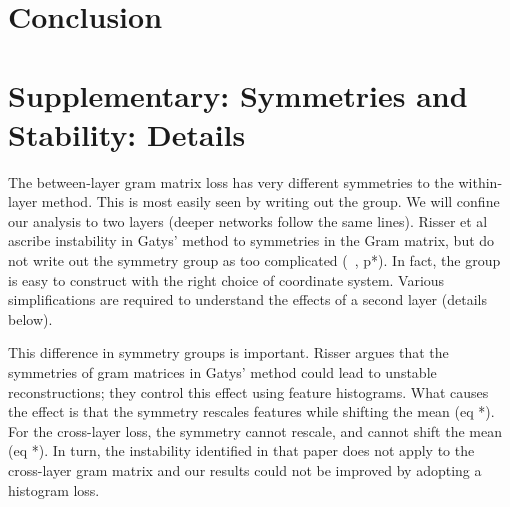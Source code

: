 \documentclass[runningheads]{llncs}
\newcommand{\expect}[1]{{\mathbb{E}}{{\left[{{#1}}\right]}}}
\begin{document}










\section{Conclusion}
  

\section*{Supplementary: Symmetries and Stability: Details}


The between-layer gram matrix loss has very different symmetries to the within-layer method.
This is most easily seen by writing out the group.  We will confine our analysis to two layers
(deeper networks follow the same lines).   Risser et al ascribe instability in Gatys' method to
symmetries in the Gram matrix, but do not write out the symmetry group as too complicated
(~\cite{}, p*).  In fact, the group is easy to construct with the right choice of coordinate system.
Various simplifications are required to understand the effects of a
second layer (details below).

This difference in symmetry groups is important.  Risser argues that
the symmetries of gram matrices in Gatys' method could lead to
unstable reconstructions; they control this effect using feature
histograms.  What causes the effect is that the symmetry rescales features while shifting the mean (eq *).  
For the cross-layer loss, the symmetry cannot rescale, and cannot shift the mean (eq *).  In turn, the instability
identified in that paper does not apply to the cross-layer gram matrix and our results could not be improved by adopting
a histogram loss.
\end{document}
